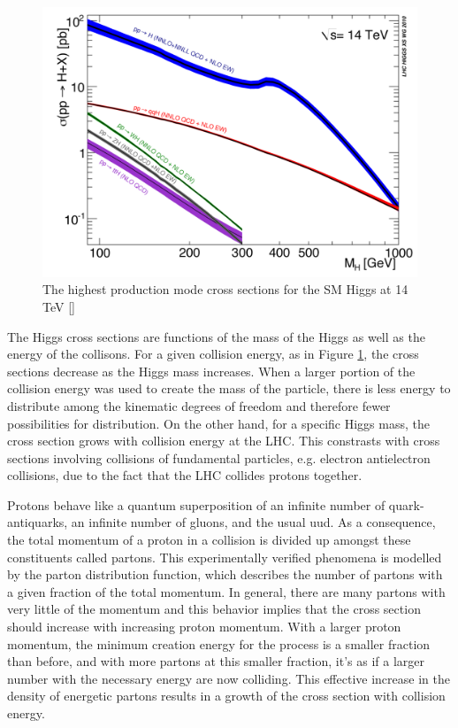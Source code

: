 \begin{figure}[h!]
  \centering
  \includegraphics[width=5in]{images/14TeV_higgs_cross_sections.png}
  \caption
   {The highest production mode cross sections for the SM Higgs at 14 TeV [\cite{crossbranchplots}]}
  \label{fig:hprodcross}
\end{figure}

The Higgs cross sections are functions of the mass of the Higgs as well as the energy of the collisons. For a given collision energy, as in Figure \ref{fig:hprodcross}, the cross sections decrease as the Higgs mass increases. When a larger portion of the collision energy was used to create the mass of the particle, there is less energy to distribute among the kinematic degrees of freedom and therefore fewer possibilities for distribution. On the other hand, for a specific Higgs mass, the cross section grows with collision energy at the LHC. This constrasts with cross sections involving collisions of fundamental particles, e.g. electron antielectron collisions, due to the fact that the LHC collides protons together. 

Protons behave like a quantum superposition of an infinite number of quark-antiquarks, an infinite number of gluons, and the usual uud. As a consequence, the total momentum of a proton in a collision is divided up amongst these constituents called partons. This experimentally verified phenomena is modelled by the parton distribution function, which describes the number of partons with a given fraction of the total momentum. In general, there are many partons with very little of the momentum and this behavior implies that the cross section should increase with increasing proton momentum. With a larger proton momentum, the minimum creation energy for the process is a smaller fraction than before, and with more partons at this smaller fraction, it's as if a larger number with the necessary energy are now colliding. This effective increase in the density of energetic partons results in a growth of the cross section with collision energy. 


